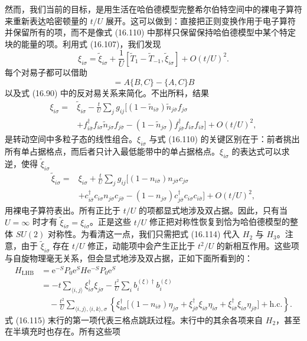 然而，我们当前的目标，是用生活在哈伯德模型完整希尔伯特空间中的裸电子算符来重新表达哈密顿量的 $t/U$ 展开。这可以做到：直接把正则变换作用于电子算符并保留所有的项，而不是像式 (16.110) 中那样只保留保持哈伯德模型中某个特定块的能量的项。利用式 (16.107)，我们发现
\begin{equation*}
\xi_{i\sigma}=\tilde{\xi}_{i\sigma}+\frac{1}{U}[\tilde{T}_{1}-\tilde{T}_{-1},\tilde{\xi}_{i\sigma}]+O(t/U)^{2}.\tag{16.111}
\end{equation*}
每个对易子都可以借助
\begin{equation*}
[AB,C]=A\{B,C\}-\{A,C\}B\tag{16.112}
\end{equation*}
以及式 (16.90) 中的反对易关系来简化。不出所料，结果
\begin{equation*}
\begin{aligned}
\xi_{i\sigma}={}&\tilde{\xi}_{i\sigma}-\frac{t}{U}\sum_{j}g_{ij}\big[(1-\tilde{n}_{i\bar{\sigma}})\tilde{n}_{j\bar{\sigma}}f_{j\sigma}\\
&+f^{\dagger}_{i\bar{\sigma}}f_{i\sigma}\tilde{n}_{j\sigma}f_{j\bar{\sigma}}-(1-\tilde{n}_{j\sigma})f^{\dagger}_{j\bar{\sigma}}f_{i\sigma}f_{i\bar{\sigma}}\big]+O(t/U)^{2},
\end{aligned}\tag{16.113}
\end{equation*}
是转动空间中多粒子态的线性组合。$\xi_{i\sigma}$ 与式 (16.110) 的关键区别在于：前者挑出所有单占据格点，而后者只计入最低能带中的单占据格点。$\xi_{i\sigma}$ 的表达式可以求逆，使得 $\tilde{\xi}_{i\sigma}$
\begin{equation*}
\begin{aligned}
\tilde{\xi}_{i\sigma}={}&\xi_{i\sigma}+\frac{t}{U}\sum_{j}g_{ij}\big[(1-n_{i\bar{\sigma}})n_{j\bar{\sigma}}c_{j\sigma}\\
&+c^{\dagger}_{i\bar{\sigma}}c_{i\sigma}n_{j\sigma}c_{j\bar{\sigma}}-(1-n_{j\sigma})c^{\dagger}_{j\bar{\sigma}}c_{i\sigma}c_{i\bar{\sigma}}\big]+O(t/U)^{2},
\end{aligned}\tag{16.114}
\end{equation*}
用裸电子算符表出。所有正比于 $t/U$ 的项都显式地涉及双占据。因此，只有当 $U=\infty$ 时才有 $\tilde{\xi}_{i\sigma}=\xi_{i\sigma}$。正是这些 $t/U$ 修正把对称性恢复到恰为哈伯德模型的整体 $SU(2)$ 对称性。为看清这一点，我们只需把式 (16.114) 代入 $H_{2}$ 与 $H_{3}$。注意，由于 $\tilde{\xi}_{i\sigma}$ 存在 $t/U$ 修正，动能项中会产生正比于 $t^{2}/U$ 的新相互作用。这些项与自旋物理毫无关系，但会显式地涉及双占据，正如下面所看到的：
\begin{align*}
H_{\mathrm{LHB}}&=\mathrm{e}^{-S}P_{0}\mathrm{e}^{S}H\mathrm{e}^{-S}P_{0}\mathrm{e}^{S}\\
&=-t\sum_{\langle i,j\rangle}\xi^{\dagger}_{i\sigma}\xi_{j\sigma}-\frac{t^{2}}{U}\sum_{i}b^{(\xi)\dagger}_{i}b^{(\xi)}_{i}\\
&\quad-\frac{t^{2}}{U}\sum_{\langle i,j\rangle,\langle i,k\rangle,\sigma}\left\{\xi^{\dagger}_{k\sigma}\big[(1-n_{i\bar{\sigma}})\eta_{j\sigma}+\xi^{\dagger}_{j\bar{\sigma}}\xi_{i\bar{\sigma}}\eta_{i\sigma}+\xi^{\dagger}_{i\bar{\sigma}}\xi_{i\sigma}\eta_{j\bar{\sigma}}\big]+\mathrm{h.c.}\right\}.\tag{16.115}
\end{align*}
式 (16.115) 末行的第一项代表三格点跳跃过程。末行中的其余各项来自 $H_{2}$，甚至在半填充时也存在。所有这些项
